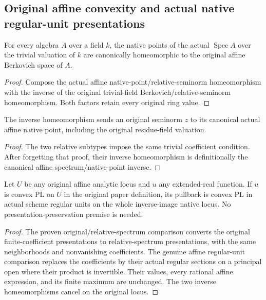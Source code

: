 \subsection{Original affine convexity and actual native regular-unit presentations}

\begin{definition}
\label{berkovich:actual-affine-paper-homeomorphism}
\leanok
For every algebra $A$ over a field $k$, the native points of the actual
$\operatorname{Spec} A$ over the trivial valuation of $k$ are canonically
homeomorphic to the original affine Berkovich space of $A$.
\end{definition}
\begin{proof}
Compose the actual affine native-point/relative-seminorm homeomorphism
with the inverse of the original trivial-field Berkovich/relative-seminorm
homeomorphism. Both factors retain every original ring value.
\end{proof}

\begin{lemma}
\label{berkovich:actual-affine-paper-homeomorphism-inverse}
\leanok
{}
The inverse homeomorphism sends an original seminorm $z$ to its canonical
actual affine native point, including the original residue-field valuation.
\end{lemma}
\begin{proof}
The two relative subtypes impose the same trivial coefficient condition.
After forgetting that proof, their inverse homeomorphism is definitionally
the canonical affine spectrum/native-point inverse.
\end{proof}

\begin{lemma}
\label{berkovich:actual-affine-convexity-from-paper}
\leanok
{}
Let $U$ be any original affine analytic locus and $u$ any extended-real
function. If $u$ is convex PL on $U$ in the original paper definition,
its pullback is convex PL in actual scheme regular units on the whole
inverse-image native locus. No presentation-preservation premise is needed.
\end{lemma}
\begin{proof}
The proven original/relative-spectrum comparison converts the original
finite-coefficient presentations to relative-spectrum presentations, with
the same neighborhoods and nonvanishing coefficients. The genuine affine
regular-unit comparison replaces the coefficients by their actual regular
sections on a principal open where their product is invertible. Their
values, every rational affine expression, and its finite maximum are
unchanged. The two inverse homeomorphisms cancel on the original locus.
\end{proof}

